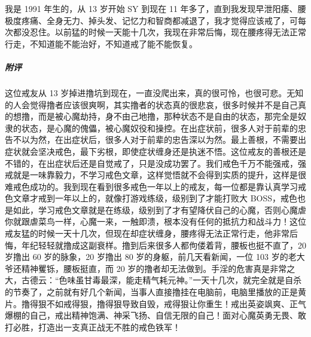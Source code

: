 \begin{case}
    我是 1991 年生的，从 13 岁开始 SY 到现在 11 年多了，直到我发现早泄阳痿、腰极度疼痛、全身无力、掉头发、记忆力和智商都减退了，我才觉得应该戒了，可每次都没忍住。以前猛的时候一天能十几次，我现在非常后悔，现在腰疼得无法正常行走，不知道能不能治好，不知道戒了能不能恢复。
    \subparagraph{附评} 这位戒友从 13 岁掉进撸坑到现在，一直没爬出来，真的很可怜，也很可悲。无知的人会觉得撸者应该很爽啊，其实撸者的状态真的很悲哀，很多时候并不是自己真的想撸，而是被心魔劫持，身不由己地撸，那种状态不是自由的状态，那完全是奴隶的状态，是心魔的傀儡，被心魔奴役和操控。在出症状前，很多人对于前辈的忠告不以为然，在出症状后，很多人对于前辈的忠告深以为然。最上善根，不需要出症状就会坚决戒色，最下劣根，即使症状缠身还是执迷不悟。这位戒友的善根还是不错的，在出症状后还是自觉戒了，只是没成功罢了。我们戒色千万不能强戒，强戒就是一味靠毅力，不学习戒色文章，这样觉悟就不会得到实质的提升，这样是很难戒色成功的。我到现在看到很多戒色一年以上的戒友，每一位都是靠认真学习戒色文章才戒到一年以上的，就像打游戏练级，级别到了才能打败大 BOSS，戒色也是如此，学习戒色文章就是在练级，级别到了才有望降伏自己的心魔，否则心魔虐你就跟虐菜鸟一样，心魔一来，一触即溃，根本没有任何的抵抗力和战斗力！这位戒友猛的时候一天十几次，但现在却症状缠身，腰疼得无法正常行走，他非常后悔，年纪轻轻就撸成这副衰样。撸到后来很多人都佝偻着背，腰板也挺不直了，20 岁撸出 60 岁的脉象，20 岁撸出 80 岁的身躯，前几天看新闻，一位 103 岁的老大爷还精神矍铄，腰板挺直，而 20 岁的撸者却无法做到。手淫的危害真是非常之大，古德云：“色味虽甘毒最深，能走精气耗元神。”一天十几次，就完全就是自杀的节奏了，之前就有好几个新闻，当事人直接撸挂在电脑前，电脑里播放的正是黄片。撸得狠不如戒得狠，撸得狠导致自毁，戒得狠让你重生！戒出英姿飒爽、正气爆棚的自己，戒出精神饱满、神采飞扬、自信无限的自己！面对心魔英勇无畏、敢打必胜，打造出一支真正战无不胜的戒色铁军！
\end{case}

